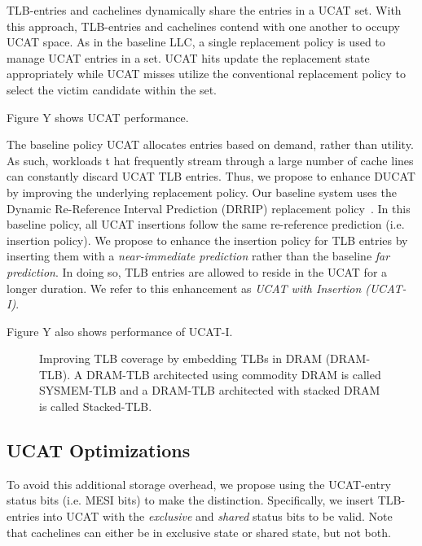 TLB-entries and cachelines dynamically share the entries in a UCAT
set. With this approach, TLB-entries and cachelines contend with one
another to occupy UCAT space. As in the baseline LLC, a single
replacement policy is used to manage UCAT entries in a set. UCAT hits
update the replacement state appropriately while UCAT misses utilize
the conventional replacement policy to select the victim candidate
within the set.


Figure Y shows UCAT performance.

The baseline policy UCAT allocates entries based on demand, rather than
utility. As such, workloads t hat frequently stream through a large
number of cache lines can constantly discard UCAT TLB entries. Thus,
we propose to enhance DUCAT by improving the underlying replacement
policy. Our baseline system uses the Dynamic Re-Reference Interval
Prediction (DRRIP) replacement policy~\cite{}. In this baseline
policy, all UCAT insertions follow the same re-reference prediction
(i.e. insertion policy). We propose to enhance the insertion policy
for TLB entries by inserting them with a {\em near-immediate
prediction} rather than the baseline {\em far prediction}. In doing
so, TLB entries are allowed to reside in the UCAT for a longer
duration. We refer to this enhancement as {\em UCAT with Insertion
(UCAT-I)}.

Figure Y also shows performance of UCAT-I.

\begin{figure*}[t] 
  \vspace{-0. in} \centering
   \centerline{}

  \caption{\small Improving TLB coverage by embedding TLBs in DRAM
    (DRAM-TLB). A DRAM-TLB architected using commodity DRAM is called
    SYSMEM-TLB and a DRAM-TLB architected with stacked DRAM is called
    Stacked-TLB. \normalsize}
  \label{fig:stacked_tlb} 
  \vspace{-0. in}
\end{figure*}

\subsection{UCAT Optimizations}

To avoid this additional storage overhead, we propose using the
UCAT-entry status bits (i.e. MESI bits) to make the distinction.
Specifically, we insert TLB-entries into UCAT with the {\em exclusive}
and {\em shared} status bits to be valid. Note that cachelines can
either be in exclusive state or shared state, but not both.

